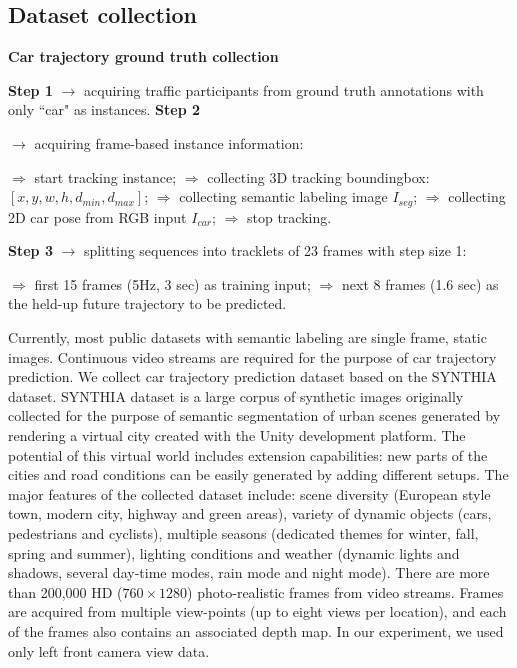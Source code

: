 \documentclass[10pt,twocolumn,letterpaper]{article}
\newlength\myindent
\newcommand\bindent[1][\myindent]{%
  \begingroup
  \setlength{\itemindent}{#1}
  \addtolength{\algorithmicindent}{#1}
}
\newcommand\eindent{\endgroup}
\begin{document}
\subsection{Dataset collection}
\begin{algorithm}[h]
\begin{algorithmic}
\caption{\textbf{Car trajectory ground truth collection}}\label{list:dataset_collection}
\STATE \textbf{Step 1} $\rightarrow $ acquiring traffic participants from ground truth annotations with only ``car" as instances.
\STATE \textbf{Step 2} {$\rightarrow $ acquiring frame-based instance information:
{
\bindent
    \STATE $\Rightarrow$ start tracking instance;
    \STATE $\Rightarrow$ collecting 3D tracking boundingbox: $[x, y, w, h, d_{min}, d_{max}]$;
    \STATE $\Rightarrow$ collecting semantic labeling image $I_{seg}$;
    \STATE $\Rightarrow$ collecting 2D car pose from RGB input $I_{car}$;
    \STATE $\Rightarrow$ stop tracking.
    \ENDIF\eindent}
  }
\STATE \textbf{Step 3} $\rightarrow $ splitting sequences into tracklets of 23 frames with step size 1:
{\bindent
    \STATE $\Rightarrow$  first 15 frames (5Hz, 3 sec) as training input;
  \STATE $\Rightarrow$  next 8 frames (1.6 sec) as the held-up future trajectory to be predicted.
  \eindent}

\end{algorithmic}
\end{algorithm}

Currently, most public datasets with semantic labeling are single frame, static images. Continuous video streams are required for the purpose of car trajectory prediction.
We collect car trajectory prediction dataset based on the SYNTHIA~\cite{ros2016synthia} dataset.
SYNTHIA dataset is a large corpus of synthetic images originally collected for the purpose of semantic segmentation of urban scenes generated by rendering a virtual city created with the Unity development platform.
The potential of this virtual world includes extension capabilities: new parts of the cities and road conditions can be easily generated by adding different setups. The major features of the collected dataset include: scene diversity (European style town, modern city, highway and green areas), variety of dynamic objects (cars, pedestrians and cyclists), multiple seasons (dedicated themes for winter, fall, spring and summer), lighting conditions and weather (dynamic lights and shadows, several day-time modes, rain mode and night mode).
There are more than 200,000 HD ($760\times1280$) photo-realistic frames from video streams.
Frames are acquired from multiple view-points (up to eight views per location), and each of the frames also contains an associated depth map. In our experiment, we used only left front camera view data.
\end{document}
